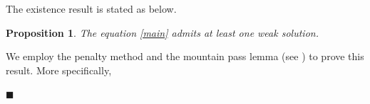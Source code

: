 \documentclass[onecolumn]{autart}
\newtheorem{proposition}{Proposition}
\newenvironment{proof}{{\it Proof: \enspace}}{\hfill $\blacksquare$\par}
\begin{document}
The existence result is stated as below.
\begin{proposition}\label{exi}
	The equation \eqref{main} admits at least one  weak solution.
\end{proposition}
\begin{proof}  We employ the penalty method and the mountain pass lemma (see \cite{Ambrosetti:1973}) to prove this result. More specifically,

\end{proof}
\end{document}
